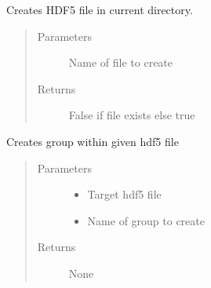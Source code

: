 \documentclass[letterpaper,10pt,english]{sphinxmanual}
\begin{document}
\begin{fulllineitems}
\label{\detokenize{index:HDF5Methods.createFile}}
\sphinxAtStartPar
Creates HDF5 file in current directory.
\begin{quote}\begin{description}
\item[{Parameters}] \leavevmode
\sphinxAtStartPar
{} \textendash{} Name of file to create

\item[{Returns}] \leavevmode
\sphinxAtStartPar
False if file exists else true

\end{description}\end{quote}

\end{fulllineitems}


\begin{fulllineitems}
\label{\detokenize{index:HDF5Methods.createGroup}}
\sphinxAtStartPar
Creates group within given hdf5 file
\begin{quote}\begin{description}
\item[{Parameters}] \leavevmode\begin{itemize}
\item {} 
\sphinxAtStartPar
{} \textendash{} Target hdf5 file

\item {} 
\sphinxAtStartPar
{} \textendash{} Name of group to create

\end{itemize}

\item[{Returns}] \leavevmode
\sphinxAtStartPar
None

\end{description}\end{quote}

\end{fulllineitems}
\end{document}
